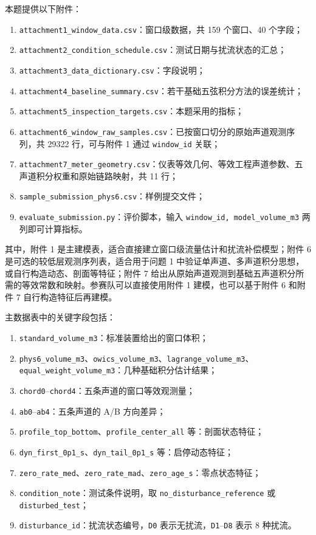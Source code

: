 \documentclass[UTF8,a4paper,11pt]{ctexart}
\begin{document}
本题提供以下附件：
\begin{enumerate}
  \item \texttt{attachment1\_window\_data.csv}：窗口级数据，共 159 个窗口、40 个字段；
  \item \texttt{attachment2\_condition\_schedule.csv}：测试日期与扰流状态的汇总；
  \item \texttt{attachment3\_data\_dictionary.csv}：字段说明；
  \item \texttt{attachment4\_baseline\_summary.csv}：若干基础五弦积分方法的误差统计；
  \item \texttt{attachment5\_inspection\_targets.csv}：本题采用的指标；
  \item \texttt{attachment6\_window\_raw\_samples.csv}：已按窗口切分的原始声道观测序列，共 29322 行，可与附件 1 通过 \texttt{window\_id} 关联；
  \item \texttt{attachment7\_meter\_geometry.csv}：仪表等效几何、等效工程声道参数、五声道积分权重和原始链路映射，共 11 行；
  \item \texttt{sample\_submission\_phys6.csv}：样例提交文件；
  \item \texttt{evaluate\_submission.py}：评价脚本，输入 \texttt{window\_id, model\_volume\_m3} 两列即可计算指标。
\end{enumerate}

其中，附件 1 是主建模表，适合直接建立窗口级流量估计和扰流补偿模型；附件 6 是可选的较低层观测序列表，适合用于问题 1 中验证单声道、多声道积分思想，或自行构造动态、剖面等特征；附件 7 给出从原始声道观测到基础五声道积分所需的等效常数和映射。参赛队可以直接使用附件 1 建模，也可以基于附件 6 和附件 7 自行构造特征后再建模。

主数据表中的关键字段包括：
\begin{enumerate}
  \item \texttt{standard\_volume\_m3}：标准装置给出的窗口体积；
  \item \texttt{phys6\_volume\_m3}、\texttt{owics\_volume\_m3}、\texttt{lagrange\_volume\_m3}、\texttt{equal\_weight\_volume\_m3}：几种基础积分估计结果；
  \item \texttt{chord0}--\texttt{chord4}：五条声道的窗口等效观测量；
  \item \texttt{ab0}--\texttt{ab4}：五条声道的 A/B 方向差异；
  \item \texttt{profile\_top\_bottom}、\texttt{profile\_center\_all} 等：剖面状态特征；
  \item \texttt{dyn\_first\_0p1\_s}、\texttt{dyn\_tail\_0p1\_s} 等：启停动态特征；
  \item \texttt{zero\_rate\_med}、\texttt{zero\_rate\_mad}、\texttt{zero\_age\_s}：零点状态特征；
  \item \texttt{condition\_note}：测试条件说明，取 \texttt{no\_disturbance\_reference} 或 \texttt{disturbed\_test}；
  \item \texttt{disturbance\_id}：扰流状态编号，\texttt{D0} 表示无扰流，\texttt{D1}--\texttt{D8} 表示 8 种扰流。
\end{enumerate}
\end{document}
